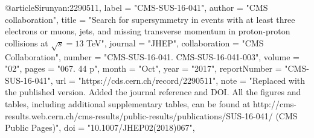 @article{Sirunyan:2290511,
      label          = "CMS-SUS-16-041",
      author        = "{CMS collaboration}",
      title         = "{Search for supersymmetry in events with at least three
                       electrons or muons, jets, and missing transverse momentum
                       in proton-proton collisions at $ \sqrt{s}=13 $ TeV}",
      journal       = "JHEP",
      collaboration = "CMS Collaboration",
      number        = "CMS-SUS-16-041. CMS-SUS-16-041-003",
      volume        = "02",
      pages         = "067. 44 p",
      month         = "Oct",
      year          = "2017",
      reportNumber  = "CMS-SUS-16-041",
      url           = "https://cds.cern.ch/record/2290511",
      note          = "Replaced with the published version. Added the journal
                       reference and DOI. All the figures and tables, including
                       additional supplementary tables, can be found at
                       http://cms-results.web.cern.ch/cms-results/public-results/publications/SUS-16-041/
                       (CMS Public Pages)",
      doi           = "10.1007/JHEP02(2018)067",
}

